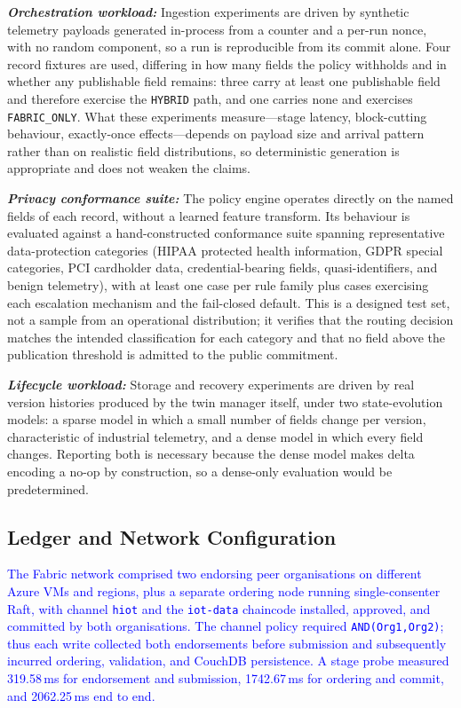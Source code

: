 \documentclass[final,5p,times,twocolumn]{elsarticle}
\begin{document}
\emph{\textbf{Orchestration workload:}} Ingestion experiments are driven by synthetic telemetry payloads generated in-process from a counter and a per-run nonce, with no random component, so a run is reproducible from its commit alone. Four record fixtures are used, differing in how many fields the policy withholds and in whether any publishable field remains: three carry at least one publishable field and therefore exercise the \texttt{HYBRID} path, and one carries none and exercises \texttt{FABRIC\_ONLY}. What these experiments measure---stage latency, block-cutting behaviour, exactly-once effects---depends on payload size and arrival pattern rather than on realistic field distributions, so deterministic generation is appropriate and does not weaken the claims.

\emph{\textbf{Privacy conformance suite:}} The policy engine operates directly on the named fields of each record, without a learned feature transform. Its behaviour is evaluated against a hand-constructed conformance suite spanning representative data-protection categories (HIPAA protected health information, GDPR special categories, PCI cardholder data, credential-bearing fields, quasi-identifiers, and benign telemetry), with at least one case per rule family plus cases exercising each escalation mechanism and the fail-closed default. This is a designed test set, not a sample from an operational distribution; it verifies that the routing decision matches the intended classification for each category and that no field above the publication threshold is admitted to the public commitment.

\emph{\textbf{Lifecycle workload:}} Storage and recovery experiments are driven by real version histories produced by the twin manager itself, under two state-evolution models: a sparse model in which a small number of fields change per version, characteristic of industrial telemetry, and a dense model in which every field changes. Reporting both is necessary because the dense model makes delta encoding a no-op by construction, so a dense-only evaluation would be predetermined.

\subsection{\textbf{Ledger and Network Configuration}}
\label{sec:ledger_config}
\textcolor{blue}{The Fabric network comprised two endorsing peer organisations on different Azure VMs and regions, plus a separate ordering node running single-consenter Raft, with channel \texttt{hiot} and the \texttt{iot-data} chaincode installed, approved, and committed by both organisations. The channel policy required \texttt{AND(Org1,Org2)}; thus each write collected both endorsements before submission and subsequently incurred ordering, validation, and CouchDB persistence. A stage probe measured 319.58\,ms for endorsement and submission, 1742.67\,ms for ordering and commit, and 2062.25\,ms end to end.}
\end{document}
